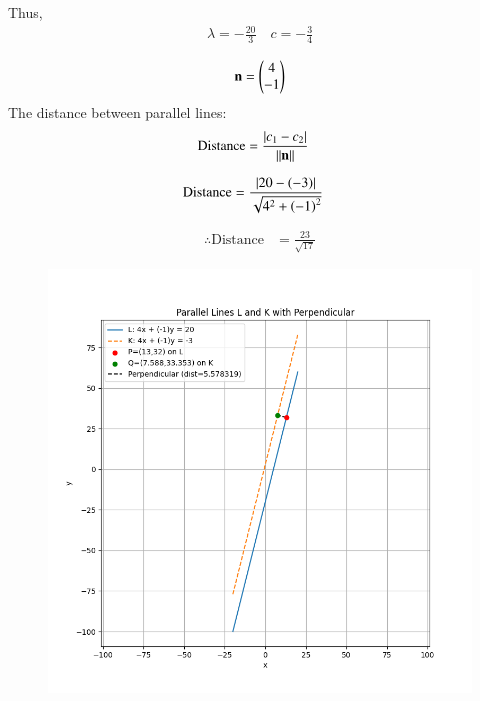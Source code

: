 \documentclass[journal]{IEEEtran}
\begin{document}
Thus,
\begin{align}
\lambda = -\frac{20}{3} \quad
c = -\frac{3}{4}
\end{align}

\begin{align}
\mathbf{n} = \begin{pmatrix}4 \\ -1\end{pmatrix}
\end{align}
The distance between parallel lines:
\begin{align}
\text{Distance} &= \frac{\left\vert c_1 - c_2\right\vert}{\left\lVert\mathbf{n}\right\rVert} 
\end{align}

\begin{align}
\text{Distance} &= \frac{\left\vert20 - (-3)\right\vert}{\sqrt{4^2 + \left(-1\right)^2}}
\end{align}

\begin{align}
\therefore \text{Distance} &= \frac{23}{\sqrt{17}}
\end{align}

\begin{figure}[h!]
    \centering
    \includegraphics[height=0.5\textheight, keepaspectratio]{figs/Figure_1.png}
    \label{figure_1}
\end{figure}
\end{document}
